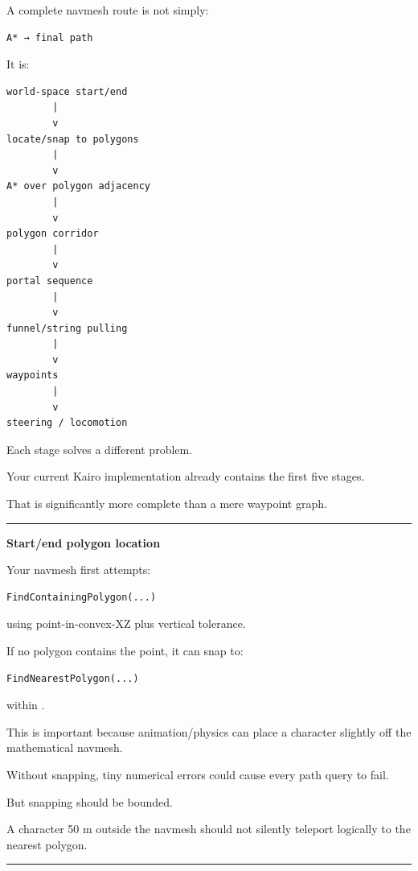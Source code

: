 A complete navmesh route is not simply:

\begin{verbatim}
A* → final path
\end{verbatim}

It is:

\begin{verbatim}
world-space start/end
        |
        v
locate/snap to polygons
        |
        v
A* over polygon adjacency
        |
        v
polygon corridor
        |
        v
portal sequence
        |
        v
funnel/string pulling
        |
        v
waypoints
        |
        v
steering / locomotion
\end{verbatim}

Each stage solves a different problem.

Your current Kairo implementation already contains the first five stages.

That is significantly more complete than a mere waypoint graph.

\begin{center}\rule{0.5\linewidth}{0.5pt}\end{center}

\textbf{Start/end polygon location}

Your navmesh first attempts:

\begin{verbatim}
FindContainingPolygon(...)
\end{verbatim}

using point-in-convex-XZ plus vertical tolerance.

If no polygon contains the point, it can snap to:

\begin{verbatim}
FindNearestPolygon(...)
\end{verbatim}

within .

This is important because animation/physics can place a character slightly off the mathematical navmesh.

Without snapping, tiny numerical errors could cause every path query to fail.

But snapping should be bounded.

A character 50 m outside the navmesh should not silently teleport logically to the nearest polygon.

\begin{center}\rule{0.5\linewidth}{0.5pt}\end{center}

